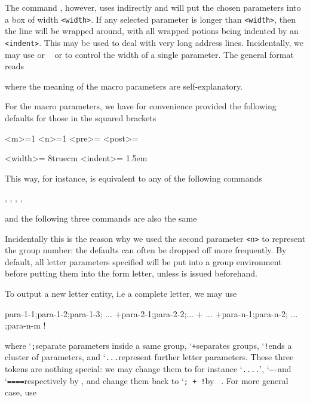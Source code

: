 {\medskip
The command {\tt \string\addressparas}, however, uses
{\tt \string\blockparas} indirectly and will put the chosen
parameters into a box of width {\tt<width>}. If any selected
parameter is longer than {\tt<width>}, then the line will be
wrapped around, with all wrapped potions being indented by an
{\tt<indent>}. This may be used to deal with very long address
lines. Incidentally, we may use {\tt \string\textbox} or {\tt
\string\addressbox} or {\tt \string\ADDRESSBOX} to control the
width of a single parameter. The general format reads


\setraw
\unsetraw

where the meaning of the macro parameters are self-explanatory.


\medskip

For the macro parameters, we have for convenience provided the
following defaults for those in the squared brackets

\setraw
  <m>=1
  <n>=1
  <pre>=\noindent
  <post>=\par
  <width>= 8truecm
  <indent>= 1.5em
\unsetraw

This way, for instance, {\tt\string\paras[1][1]} is equivalent
to any of the following commands

\setraw
  \paras, \paras[1], \paras[][1],
  \paras[1][], \paras[][]
\unsetraw

and the following three commands are also the same

\setraw
\unsetraw


\medskip

Incidentally this is the reason why we used the second parameter
{\tt<n>} to represent the group number: the defaults can often be
dropped off more frequently. By default, all letter parameters
specified will be put into a group environment before putting
them into the form letter, unless {\tt \string\localparasfalse}
is issued beforehand.

\medskip
To output a new letter entity, i.e a complete letter,
we may use


\setraw
  \moreletter
    para-1-1;para-1-2;para-1-3; ...
   +para-2-1;para-2-2;...
   +   ...
   +para-n-1;para-n-2; ... ;para-n-m !
\unsetraw


where \lq{\tt ;}\rqs separate parameters inside a same group,
\lq{\tt +}\rqs separates groups, \lq{\tt !}\rqs ends a cluster of
parameters, and \lq{\tt ...}\rqs represent further letter
parameters. These three tokens are nothing special: we may change
them  to for instance \lq{\tt ....}\rq, \lq{\tt ----}\rqs and
\lq{\tt ====}\rqs respectively by {\tt \string\blockmarks}, and
change them back to \lq{\tt ; + !}\rqs by {\tt
\string{}}.  For more general case, use

}
